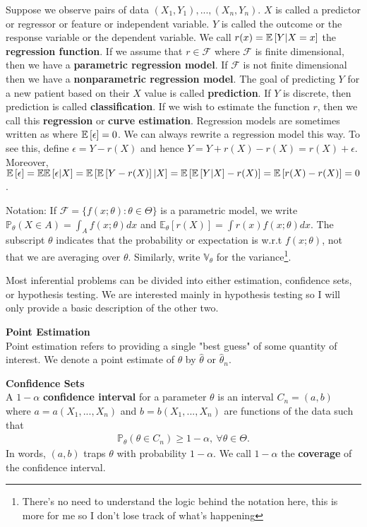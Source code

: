 \begin{exmp}
    Suppose we observe pairs of data $(X_1,Y_1),...,(X_n,Y_n)$. $X$ is called a predictor or regressor or feature or independent variable. $Y$ is called the outcome or the response variable or the dependent variable. We call $r(x) = \mathbb{E}\left[Y|X = x\right]$ the \textbf{regression function}. If we assume that $r \in \mathscr{F}$ where $\mathscr{F}$ is finite dimensional, then we have a \textbf{parametric regression model}. If $\mathscr{F}$ is not finite dimensional then we have a \textbf{nonparametric regression model}. The goal of predicting $Y$ for a new patient based on their $X$ value is called \textbf{prediction}. If $Y$ is discrete, then prediction is called \textbf{classification}. If we wish to estimate the function $r$, then we call this \textbf{regression} or \textbf{curve estimation}. Regression models are sometimes written as
    where $\mathbb{E}\left[\epsilon\right] = 0$. We can always rewrite a regression model this way. To see this, define $\epsilon = Y - r(X)$ and hence $Y = Y + r(X) - r(X) = r(X) + \epsilon$. Moreover, $\mathbb{E}\left[\epsilon\right] = \mathbb{E}\mathbb{E}\left[\epsilon|X\right] = \mathbb{E}\left[\mathbb{E}\left[Y - r(X)\right]|X\right] = \mathbb{E}\left[\mathbb{E}\left[Y|X\right] - r(X)\right] = \mathbb{E}\left[r(X) - r(X)\right] = 0$.
\end{exmp}

Notation: If $\mathscr{F} = \{f(x;\theta):\theta \in \Theta\}$ is a parametric model, we write $\mathds{P}_{\theta}(X \in A) = \int_{A}f(x;\theta) dx$ and $\mathbb{E}_{\theta}[r(X)] = \int r(x)f(x;\theta)dx$. The subscript $\theta$ indicates that the probability or expectation is w.r.t $f(x;\theta)$, not that we are averaging over $\theta$. Similarly, write $\mathbb{V}_{\theta}$ for the variance\footnote{There's no need to understand the logic behind the notation here, this is more for me so I don't lose track of what's happening}.

Most inferential problems can be divided into either estimation, confidence sets, or hypothesis testing. We are interested mainly in hypothesis testing so I will only provide a basic description of the other two.

\textbf{Point Estimation} \\
Point estimation refers to providing a single "best guess" of some quantity of interest. We denote a point estimate of $\theta$ by $\hat{\theta}$ or $\hat{\theta}_n$.

\textbf{Confidence Sets}\\
A $1 - \alpha$ \textbf{confidence interval} for a parameter $\theta$ is an interval $C_n = (a,b)$ where $a = a(X_1,...,X_n)$ and $b = b(X_1,...,X_n)$ are functions of the data such that
\begin{align}
    \mathds{P}_{\theta}(\theta \in C_n) \geq 1 - \alpha,\ \forall \theta \in \Theta.
\end{align}
In words, $(a,b)$ traps $\theta$ with probability $1 - \alpha$. We call $1 - \alpha$ the \textbf{coverage} of the confidence interval.

